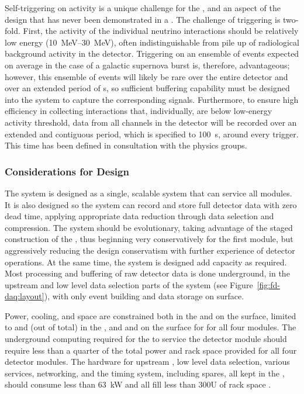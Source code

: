 Self-triggering on  activity is a unique challenge for the
 , and an aspect of the design that has never been demonstrated
in a . The challenge of  triggering is two-fold. 
First, the activity of the individual  neutrino interactions
should be relatively low energy (\SIrange{10}{30}{\mega\electronvolt}),
often indistinguishable from pile up of radiological background activity in the
detector.  Triggering on an ensemble of  events expected on
average in the case of a galactic supernova burst is, therefore,
advantageous; however, this ensemble of events will likely be rare over the
entire detector and over an extended period of \si{s}, so
sufficient buffering capability must be designed into the system to
capture the corresponding signals. 
Furthermore, to ensure high efficiency in collecting  interactions
that, individually, are below low-energy activity threshold, data from
all channels in the detector will be recorded over an extended and contiguous period,  which is specified to \SI{100}{\second}, around every 
trigger. This time has been defined in consultation with the 
physics groups.

% 

\subsubsection{Considerations for Design}
\label{sec:fd-daq:considerations}

The  system is designed as a single, scalable system that can
service all  modules. It is also designed so the
system can record and store full detector data with zero dead
time, applying appropriate data reduction through data selection and
compression. The system should be evolutionary, taking advantage of the
staged construction of the  , thus beginning very
conservatively for the first   module, but aggressively reducing
the design conservatism with further experience of detector
operations. At the same time, the system is designed add capacity as required. Most processing and buffering of raw
detector data is done underground, in the upstream  and low
level data selection parts of the
system (see Figure~\ref{fig:fd-daq:layout}), with only event building and data
storage on surface.

Power, cooling, and space are constrained both in the  and on the surface, limited to \daqpower and \daqracks (out of \cucracks total) in the , and \surfdaqpower and \surfdaqracks on the surface for  for all four  modules.
The underground computing required for the  to service the  detector module should require less than a quarter of the total power and rack space provided for all four detector modules. 
The hardware for upstream , low level data selection,
various services, networking, and the timing system, including spares,
all kept in the , 
should consume less than \SI{63}{\kilo\watt} and all fill less
than 300U of rack space \cite{ale}.


